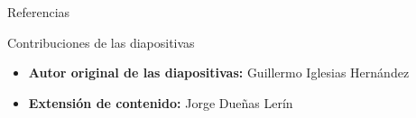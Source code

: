 \begin{frame}[allowframebreaks]{Referencias}
    
    
\end{frame}

\begin{frame}{Contribuciones de las diapositivas}
\begin{itemize}
    \item \textbf{Autor original de las diapositivas:} Guillermo Iglesias Hernández
    \item \textbf{Extensión de contenido:} Jorge Dueñas Lerín
\end{itemize}
\end{frame}

